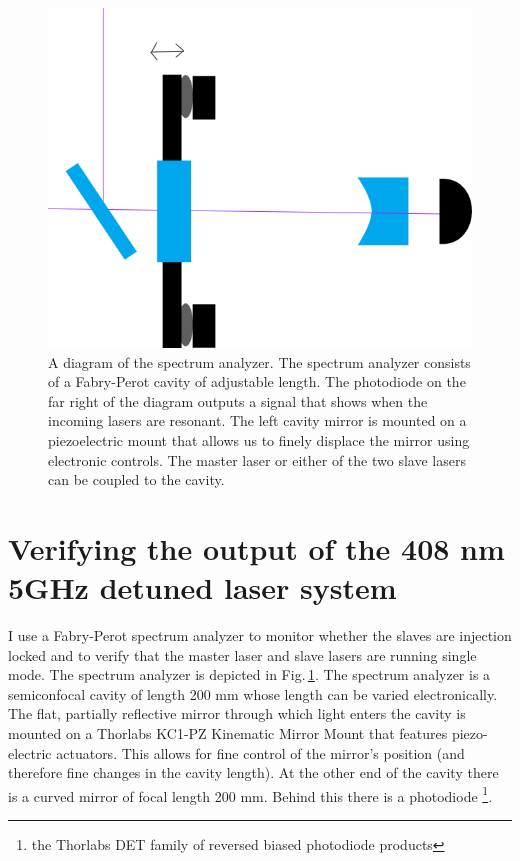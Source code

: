 \begin{figure}
    \centerline{\includegraphics[totalheight=0.3\textheight ]{spectrumAnalyzer}}
    \caption[]{\label{fig:spectrumAnalyzer}
    A diagram of the spectrum analyzer. The spectrum analyzer consists of a Fabry-Perot cavity of adjustable length. The photodiode on the far right of the diagram outputs a signal that shows when the incoming lasers are resonant. The left cavity mirror is mounted on a piezoelectric mount that allows us to finely displace the mirror using electronic controls. The master laser or either of the two slave lasers can be coupled to the cavity.
}
\end{figure} 

\section{Verifying the output of the 408 nm 5GHz detuned laser system}
\label{spectAnalayzer}
I use a Fabry-Perot spectrum analyzer to monitor whether the slaves are injection locked and to verify that the master laser and slave lasers are running single mode. The spectrum analyzer is depicted in Fig.\,\ref{fig:spectrumAnalyzer}. 
The spectrum analyzer is a semiconfocal cavity of length 200 mm whose length can be varied electronically. The flat, partially reflective mirror through which light enters the cavity is mounted on a Thorlabs KC1-PZ Kinematic Mirror Mount that features piezo-electric actuators. This allows for fine control of the mirror's position (and therefore fine changes in the cavity length). At the other end of the cavity there is a curved mirror of focal length 200 mm. Behind this there is a photodiode \footnote{the Thorlabs DET family of reversed biased photodiode products}.

